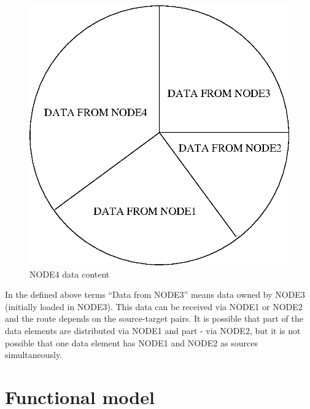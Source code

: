 \begin{figure}

\caption{NODE4 data content\label{cap:NODE4-data-content}}

\begin{center}\includegraphics{./synchronization/nodedata.eps}\end{center}
\end{figure}
In the defined above terms {}``Data from NODE3'' means data owned
by NODE3 (initially loaded in NODE3). This data can be received via
NODE1 or NODE2 and the route depends on the source-target pairs. It
is possible that part of the data elements are distributed via NODE1
and part - via NODE2, but it is not possible that one data element
has NODE1 and NODE2 as sources simultaneously.


\section{Functional model}

